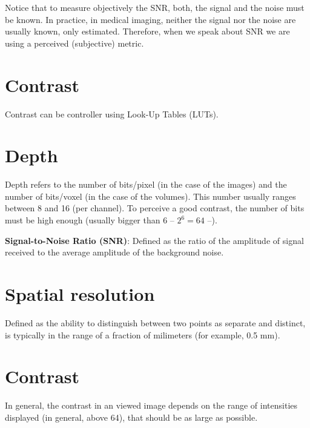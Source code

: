 Notice that to measure objectively the SNR, both, the signal and the
noise must be known. In practice, in medical imaging, neither the
signal nor the noise are usually known, only estimated. Therefore,
when we speak about SNR we are using a perceived (subjective) metric.

\section{Contrast}

Contrast can be controller using Look-Up Tables (LUTs).

\section{Depth}

Depth refers to the number of bits/pixel (in the case of the images)
and the number of bits/voxel (in the case of the volumes). This number
usually ranges between 8 and 16 (per channel). To perceive a good
contrast, the number of bits must be high enough (usually bigger than
6 -- $2^6=64$ --).


\textbf{Signal-to-Noise Ratio (SNR)}: Defined as the ratio of
  the amplitude of signal received to the average amplitude of the
  background noise.

  \section{Spatial resolution}
  Defined as the ability to
  distinguish between two points as separate and distinct, is
  typically in the range of a fraction of milimeters (for example, 0.5
  mm).

  \section{Contrast}
  In general, the contrast in an viewed image
  depends on the range of intensities displayed (in general, above 64), that should be as
  large as possible.